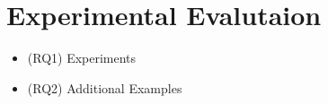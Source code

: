 \section{Experimental Evalutaion}
\label{sec:experiments}


\begin{itemize}
	\item (RQ1) Experiments
	\item (RQ2) Additional Examples
\end{itemize}